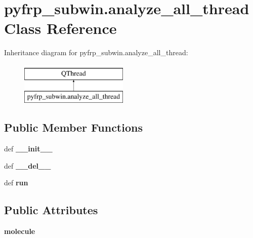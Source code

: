 \hypertarget{classpyfrp__subwin_1_1analyze__all__thread}{\section{pyfrp\+\_\+subwin.\+analyze\+\_\+all\+\_\+thread Class Reference}
\label{classpyfrp__subwin_1_1analyze__all__thread}
}
Inheritance diagram for pyfrp\+\_\+subwin.\+analyze\+\_\+all\+\_\+thread\+:\begin{figure}[H]
\begin{center}
\leavevmode
\includegraphics[height=2.000000cm]{classpyfrp__subwin_1_1analyze__all__thread}
\end{center}
\end{figure}
\subsection*{Public Member Functions}
\begin{DoxyCompactItemize}
\item 
\hypertarget{classpyfrp__subwin_1_1analyze__all__thread_aec9f4edfc0e781f2e3b20c24be00a852}{def {\bfseries \+\_\+\+\_\+init\+\_\+\+\_\+}}\label{classpyfrp__subwin_1_1analyze__all__thread_aec9f4edfc0e781f2e3b20c24be00a852}

\item 
\hypertarget{classpyfrp__subwin_1_1analyze__all__thread_adeaab23c3751b0d5f1388be250571ccb}{def {\bfseries \+\_\+\+\_\+del\+\_\+\+\_\+}}\label{classpyfrp__subwin_1_1analyze__all__thread_adeaab23c3751b0d5f1388be250571ccb}

\item 
\hypertarget{classpyfrp__subwin_1_1analyze__all__thread_a8973a06e1d896f91a46a8f82e0711bd3}{def {\bfseries run}}\label{classpyfrp__subwin_1_1analyze__all__thread_a8973a06e1d896f91a46a8f82e0711bd3}

\end{DoxyCompactItemize}
\subsection*{Public Attributes}
\begin{DoxyCompactItemize}
\item 
\hypertarget{classpyfrp__subwin_1_1analyze__all__thread_a68f691af707b243976351f638f329ea0}{{\bfseries molecule}}\label{classpyfrp__subwin_1_1analyze__all__thread_a68f691af707b243976351f638f329ea0}

\end{DoxyCompactItemize}

